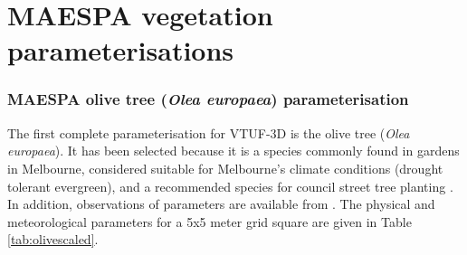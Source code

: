 \documentclass[final,3p,times,authoryear]{elsarticle}
\begin{document}
\appendix




\section{MAESPA vegetation parameterisations}\label{sec:maespavegpara}  
%
%
%
\subsubsection{MAESPA olive tree (\textit{Olea europaea}) parameterisation}
The first complete parameterisation for VTUF-3D is the olive tree (\textit{Olea europaea}). It has been selected because it is a species commonly found in gardens in Melbourne, considered suitable for Melbourne's climate conditions (drought tolerant evergreen), and a recommended species for council street tree planting \citep{PortPhillip2010}. In addition, observations of parameters are available from \cite{Coutts2014a}. The physical and meteorological parameters for a 5x5 meter grid square are given in Table \ref{tab:olivescaled}. 
\end{document}
